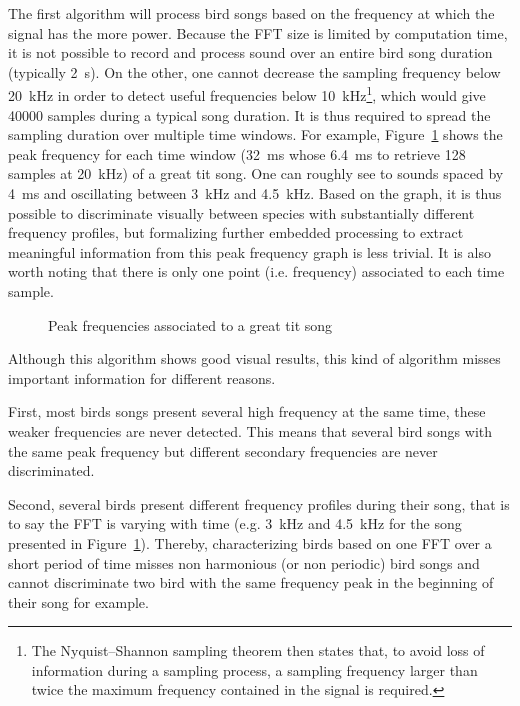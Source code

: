 \documentclass{EPL-master-thesis-covers-EN}
\begin{document}
The first algorithm will process bird songs based on the frequency at which the signal has the more power. Because the FFT size is limited by computation time, it is not possible to record and process sound over an entire bird song duration (typically \SI{2}{s}). On the other, one cannot decrease the sampling frequency below \SI{20}{kHz} in order to detect useful frequencies below \SI{10}{kHz}\footnote{The Nyquist–Shannon sampling theorem then states that, to avoid loss of information during a sampling process, a sampling frequency larger than twice the maximum frequency contained in the signal is required.}, which would give \SI{40000}{} samples during a typical song duration. It is thus required to spread the sampling duration over multiple time windows. For example, Figure~\ref{fig:peak_frequency} shows the peak frequency for each time window (\SI{32}{ms} whose \SI{6.4}{ms} to retrieve 128 samples at \SI{20}{kHz}) of a great tit song. One can roughly see to sounds spaced by \SI{4}{ms} and oscillating between \SI{3}{kHz} and \SI{4.5}{kHz}. Based on the graph, it is thus possible to discriminate visually between species with substantially different frequency profiles, but formalizing further embedded processing to extract meaningful information from this peak frequency graph is less trivial. It is also worth noting that there is only one point (i.e. frequency) associated to each time sample.

\begin{figure}[H]
    \centering
    
    \caption{Peak frequencies associated to a great tit song}
    \label{fig:peak_frequency}
\end{figure}

Although this algorithm shows good visual results, this kind of algorithm misses important information for different reasons.

First, most birds songs present several high frequency at the same time, these weaker frequencies are never detected. This means that several bird songs with the same peak frequency but different secondary frequencies are never discriminated.

Second, several birds present different frequency profiles during their song, that is to say the FFT is varying with time (e.g. \SI{3}{kHz} and \SI{4.5}{kHz} for the song presented in Figure~\ref{fig:peak_frequency}). Thereby, characterizing birds based on one FFT over a short period of time misses non harmonious (or non periodic) bird songs and cannot discriminate two bird with the same frequency peak in the beginning of their song for example.
\end{document}
